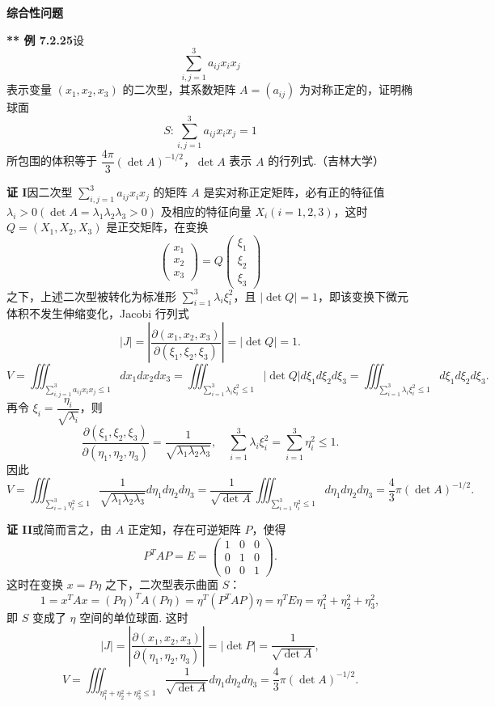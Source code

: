 \documentclass[UTF8, 12pt, fontset=fandol, oneside]{ctexart}
\begin{document}
\noindent\textbf{综合性问题}

\noindent\textbf{** 例 7.2.25}\quad 设
\[
\sum_{i,j=1}^3a_{ij}x_ix_j
\]
表示变量 $(x_1,x_2,x_3)$ 的二次型，其系数矩阵 $A=(a_{ij})$ 为对称正定的，证明椭球面
\[
S:\sum_{i,j=1}^3a_{ij}x_ix_j=1
\]
所包围的体积等于 $\dfrac{4\pi}3(\det A)^{-1/2}$，$\det A$ 表示 $A$ 的行列式.（吉林大学）

\noindent\textbf{证 I}\quad 因二次型 $\sum_{i,j=1}^3a_{ij}x_ix_j$ 的矩阵 $A$ 是实对称正定矩阵，必有正的特征值 $\lambda_i>0(\det A=\lambda_1\lambda_2\lambda_3>0)$ 及相应的特征向量 $X_i(i=1,2,3)$，这时 $Q=(X_1,X_2,X_3)$ 是正交矩阵，在变换
\[
\begin{pmatrix}x_1\\x_2\\x_3\end{pmatrix}
=Q\begin{pmatrix}\xi_1\\\xi_2\\\xi_3\end{pmatrix}
\]
之下，上述二次型被转化为标准形 $\sum_{i=1}^3\lambda_i\xi_i^2$，且 $|\det Q|=1$，即该变换下微元体积不发生伸缩变化，Jacobi 行列式
\[
|J|=\left|\frac{\partial(x_1,x_2,x_3)}{\partial(\xi_1,\xi_2,\xi_3)}\right|
=|\det Q|=1.
\]
\[
V=\iiint_{\sum_{i,j=1}^3a_{ij}x_ix_j\le1}dx_1dx_2dx_3
=\iiint_{\sum_{i=1}^3\lambda_i\xi_i^2\le1}|\det Q|d\xi_1d\xi_2d\xi_3
=\iiint_{\sum_{i=1}^3\lambda_i\xi_i^2\le1}d\xi_1d\xi_2d\xi_3.
\]
再令 $\xi_i=\dfrac{\eta_i}{\sqrt{\lambda_i}}$，则
\[
\frac{\partial(\xi_1,\xi_2,\xi_3)}{\partial(\eta_1,\eta_2,\eta_3)}
=\frac1{\sqrt{\lambda_1\lambda_2\lambda_3}},
\quad
\sum_{i=1}^3\lambda_i\xi_i^2=\sum_{i=1}^3\eta_i^2\le1.
\]
因此
\[
V=\iiint_{\sum_{i=1}^3\eta_i^2\le1}
\frac1{\sqrt{\lambda_1\lambda_2\lambda_3}}d\eta_1d\eta_2d\eta_3
=\frac1{\sqrt{\det A}}\iiint_{\sum_{i=1}^3\eta_i^2\le1}d\eta_1d\eta_2d\eta_3
=\frac43\pi(\det A)^{-1/2}.
\]

\noindent\textbf{证 II}\quad 或简而言之，由 $A$ 正定知，存在可逆矩阵 $P$，使得
\[
P^TAP=E=\begin{pmatrix}
1&0&0\\
0&1&0\\
0&0&1
\end{pmatrix}.
\]
这时在变换 $x=P\eta$ 之下，二次型表示曲面 $S$：
\[
1=x^TAx=(P\eta)^TA(P\eta)=\eta^T(P^TAP)\eta=\eta^TE\eta
=\eta_1^2+\eta_2^2+\eta_3^2,
\]
即 $S$ 变成了 $\eta$ 空间的单位球面. 这时
\[
|J|=\left|\frac{\partial(x_1,x_2,x_3)}{\partial(\eta_1,\eta_2,\eta_3)}\right|
=|\det P|=\frac1{\sqrt{\det A}},
\]
\[
V=\iiint_{\eta_1^2+\eta_2^2+\eta_3^2\le1}
\frac1{\sqrt{\det A}}d\eta_1d\eta_2d\eta_3
=\frac43\pi(\det A)^{-1/2}.
\]
\end{document}
